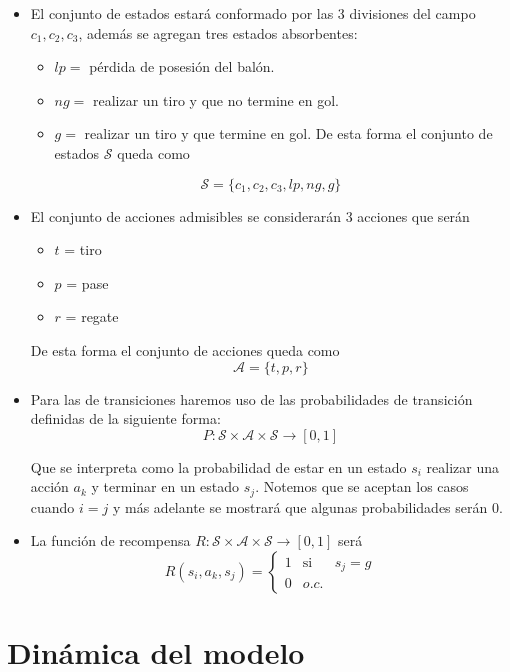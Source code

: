 \documentclass[
  us-letterpaper,
  DIV=11,
  numbers=noendperiod]{scrreprt}
\providecommand{\tightlist}{%
  \setlength{\itemsep}{0pt}\setlength{\parskip}{0pt}}\usepackage{longtable,booktabs,array}
\begin{document}
\begin{itemize}
\item
  El conjunto de estados estará conformado por las 3 divisiones del
  campo \(c_1,c_2,c_3\), además se agregan tres estados absorbentes:

  \begin{itemize}
  \tightlist
  \item
    \(lp =\) pérdida de posesión del balón.
  \item
    \(ng =\) realizar un tiro y que no termine en gol.
  \item
    \(g =\) realizar un tiro y que termine en gol. De esta forma el
    conjunto de estados \(\mathcal{S}\) queda como
  \end{itemize}

  \[
    \mathcal{S}=\{c_1,c_2,c_3,lp,ng,g\}
    \]
\item
  El conjunto de acciones admisibles se considerarán 3 acciones que
  serán

  \begin{itemize}
  \tightlist
  \item
    \(t\) = tiro
  \item
    \(p\) = pase
  \item
    \(r\) = regate
  \end{itemize}

  De esta forma el conjunto de acciones queda como
  \[\mathcal{A} = \{t,p,r\}\]
\item
  Para las de transiciones haremos uso de las probabilidades de
  transición definidas de la siguiente forma: \[
   P:\mathcal{S}\times\mathcal{A}\times\mathcal{S} \to [0,1]
   \]

  Que se interpreta como la probabilidad de estar en un estado \(s_i\)
  realizar una acción \(a_k\) y terminar en un estado \(s_j\). Notemos
  que se aceptan los casos cuando \(i=j\) y más adelante se mostrará que
  algunas probabilidades serán 0.
\item
  La función de recompensa
  \(R:\mathcal{S}\times \mathcal{A}\times \mathcal{S}\to[0,1]\) será \[
    R(s_i,a_k,s_j)=\left\{\begin{array}{ccc}
                 1 & \text{si} & s_j=g  \\
                 0 & o.c. &
            \end{array}\right.
    \]
\end{itemize}


\chapter{Dinámica del modelo}\label{dinuxe1mica-del-modelo}
\end{document}
